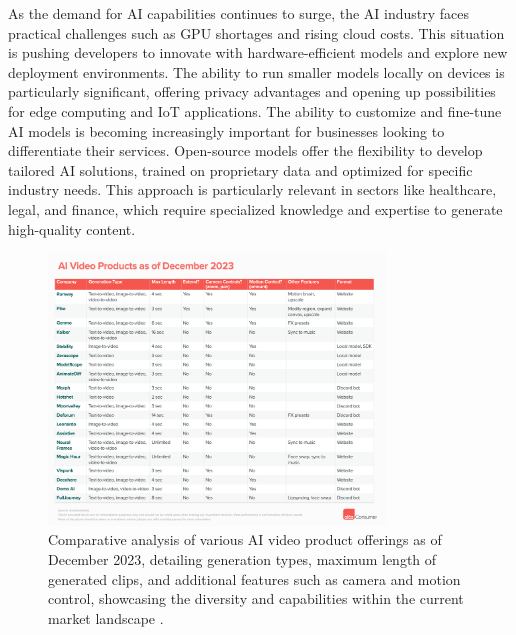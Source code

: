 \documentclass[11pt,a4paper,oneside]{report}
\begin{document}
As the demand for AI capabilities continues to surge, the AI industry faces practical challenges such as GPU shortages and rising cloud costs. 
This situation is pushing developers to innovate with hardware-efficient models and explore new deployment environments.
The ability to run smaller models locally on devices is particularly significant, offering privacy advantages and opening up possibilities for edge computing and IoT applications. 
The ability to customize and fine-tune AI models is becoming increasingly important for businesses looking to differentiate their services. 
Open-source models offer the flexibility to develop tailored AI solutions, trained on proprietary data and optimized for specific industry needs. 
This approach is particularly relevant in sectors like healthcare, legal, and finance, which require specialized knowledge and expertise to generate high-quality content.

\begin{figure}[htbp]
  \centering
  \includegraphics[width=0.8\textwidth]{products.png}
  \caption{Comparative analysis of various AI video product offerings as of December 2023, detailing generation types, maximum length of generated clips, and additional features such as camera and motion control, showcasing the diversity and capabilities within the current market landscape \cite{a16zAI2023}.}
\end{figure}
\end{document}
